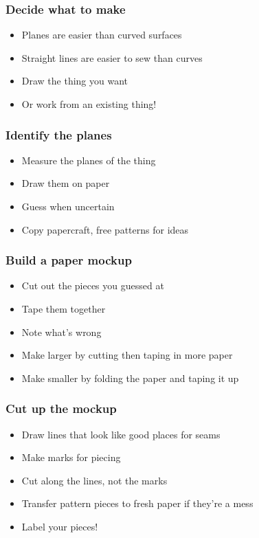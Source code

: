 \documentclass{beamer}
\begin{document}
\begin{frame}[fragile]
\frametitle{Decide what to make}
\begin{itemize}[<+(1)->]
\item Planes are easier than curved surfaces
\item Straight lines are easier to sew than curves
\item Draw the thing you want
\item Or work from an existing thing!
\end{itemize}
\end{frame}


\begin{frame}[fragile]
\frametitle{Identify the planes}
\begin{itemize}[<+(1)->]
\item Measure the planes of the thing
\item Draw them on paper
\item Guess when uncertain
\item Copy papercraft, free patterns for ideas
\end{itemize}
\end{frame}


\begin{frame}[fragile]
\frametitle{Build a paper mockup}
\begin{itemize}[<+(1)->]
\item Cut out the pieces you guessed at
\item Tape them together
\item Note what's wrong
\item Make larger by cutting then taping in more paper
\item Make smaller by folding the paper and taping it up
\end{itemize}
\end{frame}


\begin{frame}[fragile]
\frametitle{Cut up the mockup}
\begin{itemize}[<+(1)->]
\item Draw lines that look like good places for seams
\item Make marks for piecing
\item Cut along the lines, not the marks
\item Transfer pattern pieces to fresh paper if they're a mess
\item Label your pieces!
\end{itemize}
\end{frame}
\end{document}
